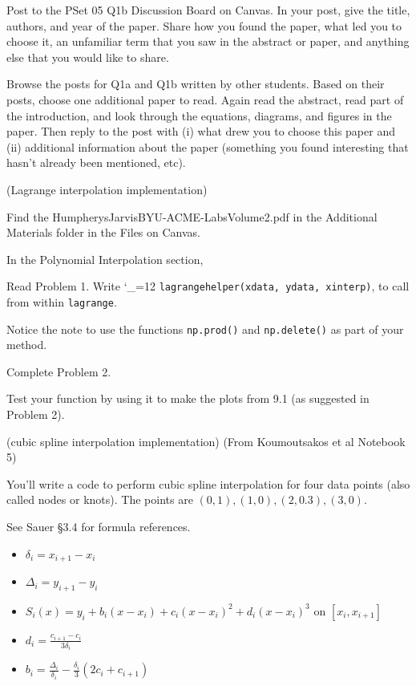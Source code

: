 \documentclass[12pt,letterpaper,noanswers]{exam}
\makeatletter
\newcommand{\pyf}{%
  \begingroup\catcode`_=12
  \pyf@
}
\newcommand{\pyf@}[1]{\texttt{#1}\endgroup}
\makeatother
\begin{document}
\begin{questions}
\begin{parts}
Post to the PSet 05 Q1b Discussion Board on Canvas.  In your post, give the title, authors, and year of the paper.  Share how you found the paper, what led you to choose it, an unfamiliar term that you saw in the abstract or paper, and anything else that you would like to share.

\item Browse the posts for Q1a and Q1b written by other students.  Based on their posts, choose one additional paper to read.  Again read the abstract, read part of the introduction, and look through the equations, diagrams, and figures in the paper.  Then reply to the post with (i) what drew you to choose this paper and (ii) additional information about the paper (something you found interesting that hasn't already been mentioned, etc).

\end{parts}  


\item (Lagrange interpolation implementation) 

Find the HumpherysJarvisBYU-ACME-LabsVolume2.pdf in the Additional Materials folder in the Files on Canvas.

In the Polynomial Interpolation section, 
\begin{parts}
\item Read Problem 1.  Write \pyf{lagrangehelper(xdata, ydata, xinterp)}, to call from within \texttt{lagrange}.  

Notice the note to use the functions \texttt{np.prod()} and \texttt{np.delete()} as part of your method.
\item Complete Problem 2.
\item Test your function by using it to make the plots from 9.1 (as suggested in Problem 2).
\end{parts}

\item (cubic spline interpolation implementation) (From Koumoutsakos et al Notebook 5)

You'll write a code to perform cubic spline interpolation for four data points (also called nodes or knots). The points are $(0,1), (1,0), (2,0.3), (3,0)$.


See Sauer \S 3.4 for formula references.
\begin{itemize}
    \item $\delta_i = x_{i+1}-x_i$
    \item $\Delta_i = y_{i+1}-y_i$
    \item $S_i(x) = y_i + b_i(x-x_i) + c_i(x-x_i)^2 + d_i(x-x_i)^3$ on $[x_i,x_{i+1}]$
    \item $d_i = \frac{c_{i+1}-c_i}{3\delta_i}$
    \item $b_i = \frac{\Delta_i}{\delta_i} - \frac{\delta_i}{3}(2c_i + c_{i+1})$
\end{itemize}



\end{questions}
\end{document}
